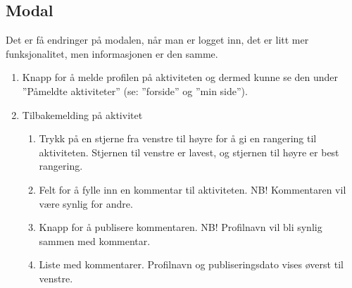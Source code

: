 \subsection{Modal}
\begin{center}
\end{center}
Det er få endringer på modalen, når man er logget inn, det er litt mer funksjonalitet, men informasjonen er den samme.
\begin{enumerate}[nosep]
    \item Knapp for å melde profilen på aktiviteten og dermed kunne se den under ”Påmeldte aktiviteter” (se: ”forside” og ”min side”).
    \item Tilbakemelding på aktivitet
    \begin{enumerate}
        \item Trykk på en stjerne fra venstre til høyre for å gi en rangering til aktiviteten. Stjernen til venstre er lavest, og stjernen til høyre er best rangering.
        \item Felt for å fylle inn en kommentar til aktiviteten. NB! Kommentaren vil være synlig for andre.
        \item Knapp for å publisere kommentaren. NB! Profilnavn vil bli synlig sammen med kommentar.
        \item Liste med kommentarer. Profilnavn og publiseringsdato vises øverst til venstre. 
    \end{enumerate}
\end{enumerate}

